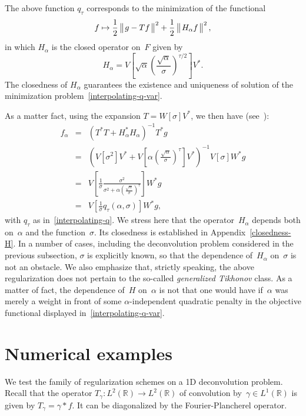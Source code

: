 \documentclass[a4paper]{article}
\def\Re{\mathds{R}}
\def\vphan{\vphantom{\bigl|}}
\def\normc#1{
    \left\|
    \mskip 2mu #1 \vphan \mskip 2mu
    \right\|
    }
\begin{document}
The above function $q_\tau$ corresponds to the minimization of the functional
\begin{equation}
\label{interpolating-q-var}
f\mapsto
\frac{1}{2}\normc{g-Tf}^2+\frac{1}{2}\normc{H_\alpha f}^2,
\end{equation}
in which $H_\alpha$ is the closed operator on~$F$ given by
$$
H_\alpha=V\left[\sqrt{\alpha}\left(\frac{\sqrt{\alpha}}{\sigma}\right)^{\tau/2}\right]V^*.
$$
The closedness of $H_{\alpha}$ guarantees the existence and uniqueness of solution of the minimization problem~\eqref{interpolating-q-var}.~\cite[Theorem 1 on p. 3]{morozov1984}

As a matter fact, using the expansion $T=W[\sigma]V^*$,
we then have (see~\cite[Section 25, p. 214]{morozov1984}):
\begin{eqnarray*}
f_\alpha
&=&
(T^*T+H_\alpha^*H_\alpha)^{-1}T^*g\\
&=&
\left(
V[\sigma^2]V^*+
V\left[\alpha\left(\frac{\sqrt{\alpha}}{\sigma}\right)^\tau\right]V^*
\right)^{-1}
V[\sigma]W^*g\\
&=&
V\left[\frac{1}{\sigma}
\frac{\sigma^2}
{\sigma^2+\alpha\left(\frac{\sqrt{\alpha}}{\sigma}\right)^\tau}
\right]W^*g\\
&=&
V\left[\frac{1}{\sigma}q_\tau(\alpha,\sigma)\right]W^*g,
\end{eqnarray*}
with $q_\tau$ as in~\eqref{interpolating-q}.
We stress here that the operator~$H_\alpha$ depends
both on~$\alpha$ and the function~$\sigma$. Its closedness
is established in Appendix~\ref{closedness-H}.
In a number of cases, including the deconvolution
problem considered in the previous subsection, $\sigma$ is explicitly 
known, so that the dependence of~$H_\alpha$ on~$\sigma$ is not an obstacle.
We also emphasize that, strictly speaking, the above regularization
does not pertain to the so-called {\sl generalized Tikhonov} class.
As a matter of fact, the dependence of~$H$ on~$\alpha$
is not that one would have if~$\alpha$ was merely a weight
in front of some $\alpha$-independent quadratic penalty
in the objective functional displayed in~\eqref{interpolating-q-var}.

\section{Numerical examples}

We test the family of regularization schemes on a 1D
deconvolution problem. Recall that the operator
$T_\gamma\colon L^2(\Re) \to L^2(\Re)$ of
convolution by~$\gamma\in L^1(\Re)$ is given
by $T_\gamma = \gamma * f$. It can be diagonalized
by the Fourier-Plancherel operator.
\end{document}
